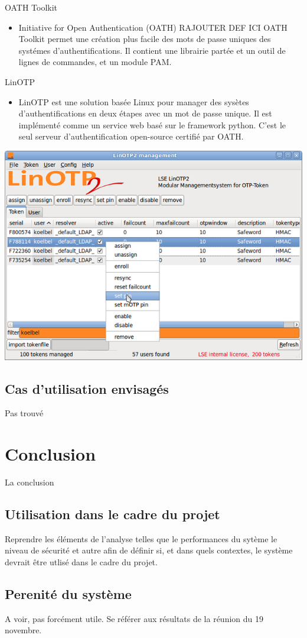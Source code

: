 \documentclass{beamer}
\begin{document}
  
  OATH Toolkit
  \begin{itemize}
    \item Initiative for Open Authentication (OATH) RAJOUTER DEF ICI OATH Toolkit permet une cr\'{e}ation plus facile des mots de passe uniques des syst\'{e}mes d'authentifications. Il contient 
    une librairie part\'{e}e et un outil de lignes de commandes, et un module PAM.
  \end{itemize}
  
  LinOTP
  \begin{itemize}
    \item LinOTP est une solution bas\'ee Linux pour manager des sys\`{e}tes d'authentifications en deux \'{e}tapes avec un mot de passe unique.
    Il est impl\'{e}ment\'{e} comme un service web bas\'{e} sur le framework python. C'est le seul serveur d'authentification open-source certifi\'{e} par OATH.
  \end{itemize}
  \includegraphics[scale=0.5]{imgHOTP/linOTP.png}
  
  \subsection{Cas d'utilisation envisag\'es}
  Pas trouv\'e
  
\section{Conclusion}
La conclusion
  \subsection{Utilisation dans le cadre du projet}
  Reprendre les \'el\'ements de l'analyse telles que le performances du syt\`eme le niveau de s\'ecurit\'e et autre afin de d\'efinir si, et dans quels contextes, le syst\`eme devrait
  \^etre utlis\'e dans le cadre du projet.
  
  \subsection{Perenit\'e du syst\`eme}
  A voir, pas forc\'ement utile. Se r\'ef\'erer aux r\'esultats de la r\'eunion du 19 novembre.
    
\end{document}
